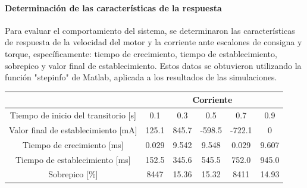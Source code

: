 \documentclass[a4paper, 10pt, onecolumn,journal]{ieeeconf}
\begin{document}
\paragraph{\textbf{Determinación de las características de la respuesta}}
Para evaluar el comportamiento del sistema, se determinaron las características de respuesta de la velocidad del motor y la corriente ante escalones de consigna y torque, específicamente: tiempo de crecimiento, tiempo de establecimiento, sobrepico y valor final de establecimiento. Estos datos se obtuvieron utilizando la función "stepinfo" de Matlab, aplicada a los resultados de las simulaciones.
\begin{table}[H]
	\centering
	\begin{tabular}{|c|ccccc|}
		\hline
		& \multicolumn{5}{c|}{Corriente}                                                                                              \\ \hline
		Tiempo de inicio del transitorio {[}s{]} & \multicolumn{1}{c|}{0.1}   & \multicolumn{1}{c|}{0.3}   & \multicolumn{1}{c|}{0.5}    & \multicolumn{1}{c|}{0.7}    & 0.9   \\ \hline
		Valor final de establecimiento {[}mA{]}  & \multicolumn{1}{c|}{125.1} & \multicolumn{1}{c|}{845.7} & \multicolumn{1}{c|}{-598.5} & \multicolumn{1}{c|}{-722.1} & 0     \\ \hline
		Tiempo de crecimiento {[}ms{]}           & \multicolumn{1}{c|}{0.029} & \multicolumn{1}{c|}{9.542} & \multicolumn{1}{c|}{9.548}  & \multicolumn{1}{c|}{0.029}  & 9.607 \\ \hline
		Tiempo de establecimiento {[}ms{]}       & \multicolumn{1}{c|}{152.5} & \multicolumn{1}{c|}{345.6} & \multicolumn{1}{c|}{545.5}  & \multicolumn{1}{c|}{752.0}  & 945.0 \\ \hline
		Sobrepico {[}\%{]}                       & \multicolumn{1}{c|}{8447}  & \multicolumn{1}{c|}{15.36} & \multicolumn{1}{c|}{15.32}  & \multicolumn{1}{c|}{8411}   & 14.93 \\ \hline
	\end{tabular}
\end{table}
\end{document}

